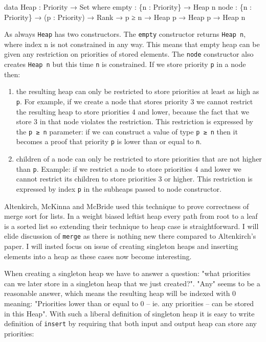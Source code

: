 \begin{code}
data Heap : Priority → Set where
  empty : \{n : Priority\} → Heap n
  node  : \{n : Priority\} → (p : Priority) → Rank → p ≥ n →
          Heap p → Heap p → Heap n
\end{code}
\noindent
As always \texttt{Heap} has two constructors. The \texttt{empty} constructor returns \texttt{Heap n}, where index n is not constrained in any way. This means that empty heap can be given any restriction on priorities of stored elements. The \texttt{node} constructor also creates \texttt{Heap n} but this time \texttt{n} is constrained. If we store priority \texttt{p} in a node then:

\begin{enumerate}
 \item the resulting heap can only be restricted to store priorities at least as high as \texttt{p}. For example, if we create a node that stores priority 3 we cannot restrict the resulting heap to store priorities 4 and lower, because the fact that we store 3 in that node violates the restriction. This restriction is expressed by the \texttt{p ≥ n} parameter: if we can construct a value of type \texttt{p ≥ n} then it becomes a proof that priority \texttt{p} is lower than or equal to \texttt{n}.
 \item children of a node can only be restricted to store priorities that are not higher than \texttt{p}. Example: if we restrict a node to store priorities 4 and lower we cannot restrict its children to store priorities 3 or higher. This restriction is expressed by index \texttt{p} in the subheaps passed to node constructor.
\end{enumerate}

Altenkirch, McKinna and McBride \cite{AltMcBMcK05} used this technique to prove correctness of merge sort for lists. In a weight biased leftist heap every path from root to a leaf is a sorted list so extending their technique to heap case is straightforward. I will elide discussion of \texttt{merge} as there is nothing new there compared to Altenkirch's paper. I will insted focus on issue of creating singleton heaps and inserting elements into a heap as these cases now become interesting.

When creating a singleton heap we have to answer a question: "what priorities can we later store in a singleton heap that we just created?". "Any" seems to be a reasonable answer, which means the resulting heap will be indexed with 0 meaning: "Priorities lower than or equal to 0 -- ie. any priorities -- can be stored in this Heap". With such a liberal definition of singleton heap it is easy to write definition of \texttt{insert} by requiring that both input and output heap can store any priorities:

